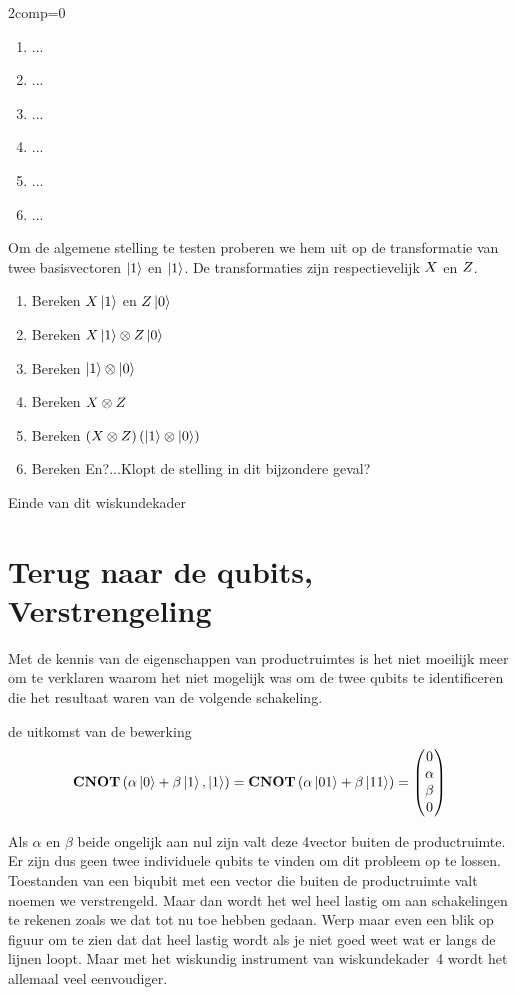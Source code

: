 \documentclass[../main.tex]{subfiles}
\begin{document}
\begin{mdframed}[style=wiskader,frametitle={Matrixen}]
\begin{antwoord}
2comp=0
\begin{enumerate}
\item ...
\item ...
\item ...
\item ...
\item ...
\item ...
\end{enumerate}
\end{antwoord}
\begin{opdracht}
Om de algemene stelling te testen proberen we hem uit op de transformatie van twee basisvectoren $\ket{1}$ en $\ket{1}$. De transformaties zijn respectievelijk $X$ en $Z$.
\begin{enumerate}
\item Bereken $X\ket{1}$ en $Z\ket{0}$
\item Bereken $X\ket{1} \otimes Z\ket{0}$
\item Bereken $\ket{1} \otimes \ket{0}$
\item Bereken $X \otimes Z$
\item Bereken $\left(X \otimes Z\right)\left(\ket{1} \otimes \ket{0} \right)$
\item Bereken En?...Klopt de stelling in dit bijzondere geval?
\end{enumerate}
\end{opdracht}

Einde van dit wiskundekader
\end{mdframed}


\section{Terug naar de qubits, Verstrengeling}
Met de kennis van de eigenschappen van productruimtes is het niet moeilijk meer om te verklaren waarom het niet mogelijk was om de twee qubits te identificeren die het resultaat waren van de volgende schakeling. 

de uitkomst van de bewerking 
\[ \port{CNOT}\left(\alpha\ket{0}+\beta\ket{1},\ket{1}\right) 
 = \port{CNOT}\left(\alpha\ket{01}+\beta\ket{11}\right)%
 = \mqty(0\\ \alpha \\ \beta \\0)\]

Als $\alpha$ en $\beta$ beide ongelijk aan nul zijn valt deze 4vector buiten de productruimte.
Er zijn dus geen twee individuele qubits te vinden om dit probleem op te lossen. 
Toestanden van een biqubit met een vector die buiten de productruimte valt noemen we verstrengeld. 
Maar dan wordt het wel heel lastig om aan schakelingen te rekenen zoals we dat tot nu toe hebben gedaan. Werp maar even een blik op figuur  om te zien dat dat heel lastig wordt als je niet goed weet wat er langs de lijnen loopt. Maar met het wiskundig instrument van wiskundekader~4 wordt het allemaal veel eenvoudiger. 
\end{document}
